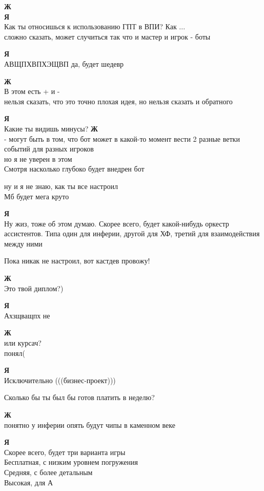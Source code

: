 \textbf{Ж} \\
\textbf{Я} \\
Как ты относишься к использованию ГПТ в ВПИ? Как ... \\
сложно сказать, может случиться так что и мастер и игрок - боты

\textbf{Я} \\
АВЩПХВПХЭЩВП да, будет шедевр

\textbf{Ж} \\
В этом есть + и - \\
нельзя сказать, что это точно плохая идея, но нельзя сказать и обратного

\textbf{Я} \\
Какие ты видишь минусы?
\textbf{Ж} \\
- могут быть в том, что бот может в какой-то момент вести 2 разные ветки событий для разных игроков \\
но я не уверен в этом \\
Смотря насколько глубоко будет внедрен бот

ну и я не знаю, как ты все настроил \\
Мб будет мега круто

\textbf{Я} \\
Ну жиз, тоже об этом думаю. Скорее всего, будет какой-нибудь оркестр ассистентов. Типа один для инферии, другой для ХФ, третий для взаимодействия между ними

Пока никак не настроил, вот кастдев провожу!

\textbf{Ж} \\
Это твой диплом?)

\textbf{Я} \\
Ахзщващпх не

\textbf{Ж} \\
или курсач? \\
понял(

\textbf{Я} \\
Исключительно (((бизнес-проект)))

Сколько бы ты был бы готов платить в неделю?

\textbf{Ж} \\
понятно
у инферии опять будут чипы в каменном веке

\textbf{Я} \\
Скорее всего, будет три варианта игры \\
Бесплатная, с низким уровнем погружения \\
Средняя, с более детальным \\
Высокая, для А

